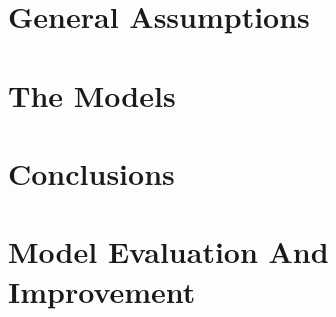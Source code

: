 \documentclass{mcmthesis}
\begin{document}
\section{General Assumptions}
  

\section{The Models}
  

\section{Conclusions}
  

\section{Model Evaluation And Improvement}
  


\newpage



\end{document}
